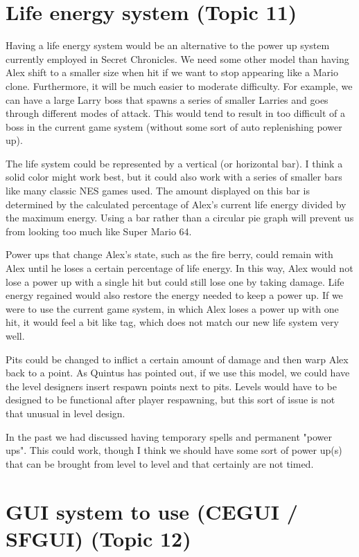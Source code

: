 \documentclass{gd-document}
\begin{document}
\section{Life energy system (Topic 11)}

Having a life energy system would be an alternative to the power up
system currently employed in Secret Chronicles.  We need some other
model than having Alex shift to a smaller size when hit if we want to
stop appearing like a Mario clone.  Furthermore, it will be much
easier to moderate difficulty.  For example, we can have a large Larry
boss that spawns a series of smaller Larries and goes through
different modes of attack.  This would tend to result in too difficult
of a boss in the current game system (without some sort of auto
replenishing power up).

The life system could be represented by a vertical (or horizontal
bar).  I think a solid color might work best, but it could also work
with a series of smaller bars like many classic NES games used.  The
amount displayed on this bar is determined by the calculated
percentage of Alex's current life energy divided by the maximum
energy.  Using a bar rather than a circular pie graph will prevent us
from looking too much like Super Mario 64.

Power ups that change Alex's state, such as the fire berry, could
remain with Alex until he loses a certain percentage of life energy.
In this way, Alex would not lose a power up with a single hit but
could still lose one by taking damage.  Life energy regained would
also restore the energy needed to keep a power up.  If we were to use
the current game system, in which Alex loses a power up with one hit,
it would feel a bit like tag, which does not match our new life system
very well.

Pits could be changed to inflict a certain amount of damage and then
warp Alex back to a point.  As Quintus has pointed out, if we use this
model, we could have the level designers insert respawn points next to
pits.  Levels would have to be designed to be functional after player
respawning, but this sort of issue is not that unusual in level
design.

In the past we had discussed having temporary spells and permanent
"power ups".  This could work, though I think we should have some sort
of power up(s) that can be brought from level to level and that
certainly are not timed.

\section{GUI system to use (CEGUI / SFGUI) (Topic 12)}
\end{document}
